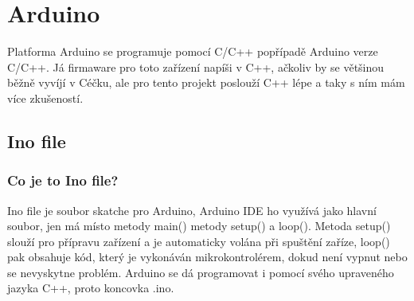 
\section{Arduino}
Platforma Arduino se programuje pomocí C/C++ popřípadě Arduino verze C/C++. Já firmaware pro toto zařízení napíši v C++, ačkoliv by se většinou běžně vyvíjí v Céčku, ale pro tento projekt poslouží C++ lépe a taky s ním mám více zkušeností.

\subsection{Ino file}


\subsubsection*{Co je to Ino file?}
Ino file je soubor skatche pro Arduino, Arduino IDE ho využívá jako hlavní soubor, jen má místo metody main() metody setup() a loop().  Metoda setup() slouží pro přípravu zařízení a je automaticky volána při spuštění zaříze,  loop() pak obsahuje kód, který je vykonáván mikrokontrolérem, dokud není vypnut nebo se nevyskytne problém. Arduino se dá programovat i pomocí svého upraveného jazyka C++, proto koncovka .ino.
